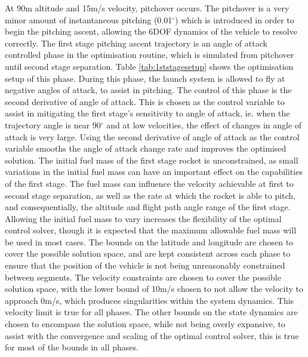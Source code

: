 At 90m altitude and 15m/s velocity, pitchover occurs. The pitchover is a very minor amount of instantaneous pitching (0.01$^\circ$) which is introduced in order to begin the pitching ascent, allowing the 6DOF dynamics of the vehicle to resolve correctly. 
The first stage pitching ascent trajectory is an angle of attack controlled phase in the optimisation routine, which is simulated from pitchover until second stage separation. Table \ref{tab:1ststagesetup} shows the optimisation setup of this phase. During this phase, the launch system is allowed to fly at negative angles of attack, to assist in pitching. The control of this phase is the second derivative of angle of attack. This is chosen as the control variable to assist in mitigating the first stage's sensitivity to angle of attack, ie. when the trajectory angle is near 90$^\circ$ and at low velocities, the effect of changes in angle of attack is very large. Using the second derivative of angle of attack as the control variable smooths the angle of attack change rate and improves the optimised solution. 
The initial fuel mass of the first stage rocket is unconstrained, as small variations in the initial fuel mass can have an important effect on the capabilities of the first stage. The fuel mass can influence the velocity achievable at first to second stage separation, as well as the rate at which the rocket is able to pitch, and consequentially, the altitude and flight path angle range of the first stage.
Allowing the initial fuel mass to vary increases the flexibility of the optimal control solver, though it is expected that the maximum allowable fuel mass will be used in most cases. 
The bounds on the latitude and longitude are chosen to cover the possible solution space, and are kept consistent across each phase to ensure that the position of the vehicle is not being unreasonably constrained between segments. The velocity constraints are chosen to cover the possible solution space, with the lower bound of 10m/s chosen to not allow the velocity to approach 0m/s, which produces singularities within the system dynamics. This velocity limit is true for all phases. 
The other bounds on the state dynamics are chosen to encompass the solution space, while not being overly expansive, to assist with the convergence and scaling of the optimal control solver, this is true for most of the bounds in all phases. 

